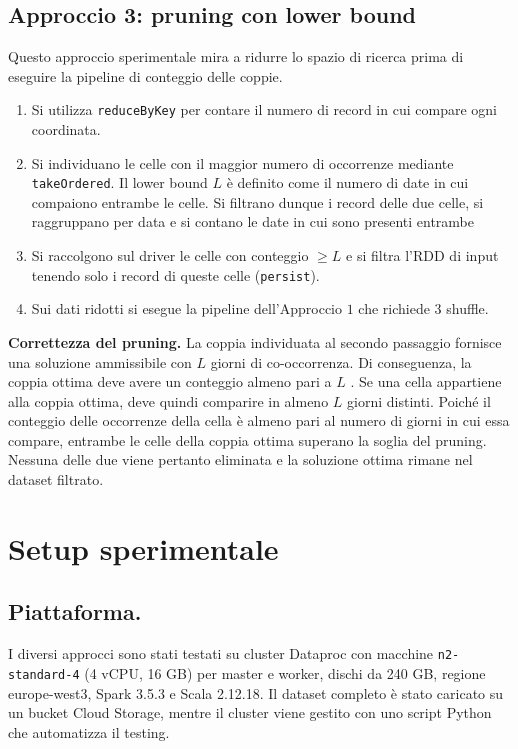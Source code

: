 \documentclass[10pt,a4paper]{article}
\begin{document}
\subsection{Approccio 3: pruning con lower bound}
Questo approccio sperimentale mira a ridurre lo spazio di ricerca prima di eseguire la pipeline di conteggio delle coppie.
\begin{enumerate}
  \item Si utilizza \texttt{reduceByKey} per contare il numero di  record in cui compare ogni coordinata.
  \item Si individuano le celle con il maggior numero di occorrenze mediante \texttt{takeOrdered}. Il lower bound $L$ è definito come il numero di date in cui compaiono entrambe le celle. Si filtrano dunque i record delle due celle, si raggruppano per data e si contano le date in cui sono presenti entrambe
  \item Si raccolgono sul driver le celle con conteggio $\ge L$ e si filtra l'RDD di input tenendo solo i record di queste celle (\texttt{persist}).
  \item Sui dati ridotti si esegue la pipeline dell'Approccio $1$ che richiede 3 shuffle.
\end{enumerate}
\textbf{Correttezza del pruning.}  La coppia individuata al secondo passaggio fornisce una soluzione ammissibile con $L$ giorni di co-occorrenza. Di conseguenza, la coppia ottima deve avere un conteggio almeno pari a $L$ . Se una cella appartiene alla coppia ottima, deve quindi comparire in almeno $L$ giorni distinti. Poiché il conteggio delle occorrenze della cella è almeno pari al numero di giorni in cui essa compare, entrambe le celle della coppia ottima superano la soglia del pruning. Nessuna delle due viene pertanto eliminata e la soluzione ottima rimane nel dataset filtrato.

\section{Setup sperimentale}
\subsection{Piattaforma.} 
I diversi approcci sono stati testati su cluster Dataproc con macchine \texttt{n2-standard-4} (4 vCPU, 16 GB) per master e worker, dischi da 240 GB, regione europe-west3, Spark 3.5.3 e Scala 2.12.18. Il dataset completo è stato caricato su un bucket Cloud Storage, mentre il cluster viene gestito con uno script Python che automatizza il testing.
\end{document}
